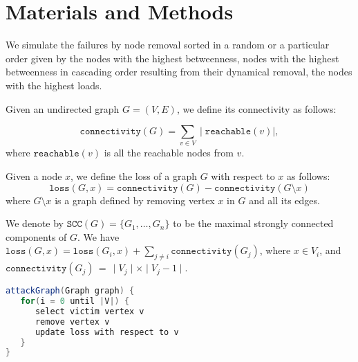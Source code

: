 \section{Materials and Methods}
\label{methods}
We  simulate the failures by node removal sorted in a random or a particular order given by the nodes with the highest betweenness, nodes with the highest betweenness in cascading order resulting from their dynamical removal, the nodes with the highest loads. 

Given an undirected graph $G=(V,E)$, we define its connectivity as follows:

$$
\mathtt{connectivity}(G) = \sum_{v \in V} \mid \mathtt{reachable}(v) \mid,
$$ where $\mathtt{reachable}(v)$ is all the reachable nodes from $v$.

Given a node $x$, we define the loss of a graph $G$ with respect to $x$ as follows:
$$
\mathtt{loss}(G, x) = \mathtt{connectivity}(G) - \mathtt{connectivity}(G \setminus x)
$$
where $G \setminus x$ is a graph defined by removing vertex $x$ in $G$ and all its edges. 

We denote by $\mathtt{SCC}(G) = \{G_1, \ldots, G_n\}$ to be the maximal strongly connected components of $G$. 
We have $\mathtt{loss}(G, x) = \mathtt{loss}(G_i,x) + \sum_{j \neq i} \mathtt{connectivity}(G_j)$, where $x \in V_i$, and  $\mathtt{connectivity}(G_j) \,=\, \mid V_j \mid \times \mid V_j  - 1\mid$.

\begin{lstlisting}[language=java]
attackGraph(Graph graph) {
   for(i = 0 until |V|) {
      select victim vertex v
      remove vertex v
      update loss with respect to v
   }
}
\end{lstlisting}

